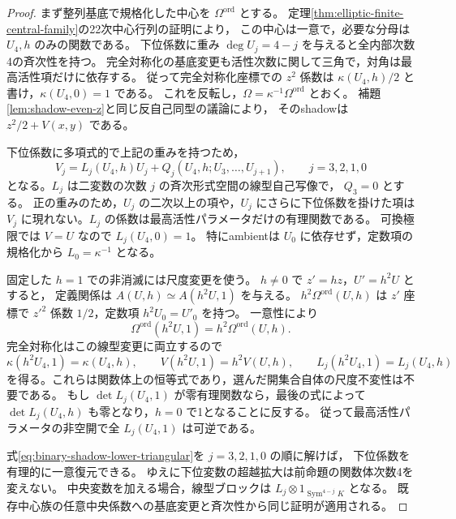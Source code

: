 \begin{proof}
まず整列基底で規格化した中心を $\Omega^{\mathrm{ord}}$ とする。
定理\ref{thm:elliptic-finite-central-family}の22次中心行列の証明により，
この中心は一意で，必要な分母は $U_4,h$ のみの関数である。
下位係数に重み $\deg U_j=4-j$ を与えると全内部次数4の斉次性を持つ。
完全対称化の基底変更も活性次数に関して三角で，対角は最高活性項だけに依存する。
従って完全対称化座標での $z^2$ 係数は
$\kappa(U_4,h)/2$ と書け，$\kappa(U_4,0)=1$ である。
これを反転し，$\Omega=\kappa^{-1}\Omega^{\mathrm{ord}}$ とおく。
補題\ref{lem:shadow-even-z}と同じ反自己同型の議論により，
そのshadowは $z^2/2+V(x,y)$ である。

下位係数に多項式的で上記の重みを持つため，
\begin{equation}\label{eq:binary-shadow-lower-triangular}
 V_j=L_j(U_4,h)U_j+
 Q_j(U_4,h;U_3,\ldots,U_{j+1}),\qquad j=3,2,1,0
\end{equation}
となる。$L_j$ は二変数の次数 $j$ の斉次形式空間の線型自己写像で，
$Q_3=0$ とする。
正の重みのため，$U_j$ の二次以上の項や，$U_j$ にさらに下位係数を掛けた項は
$V_j$ に現れない。$L_j$ の係数は最高活性パラメータだけの有理関数である。
可換極限では $V=U$ なので $L_j(U_4,0)=1$。
特にambientは $U_0$ に依存せず，定数項の規格化から
$L_0=\kappa^{-1}$ となる。

固定した $h=1$ での非消滅には尺度変更を使う。
$h\ne0$ で $z'=hz$，$U'=h^2U$ とすると，
定義関係は $A(U,h)\simeq A(h^2U,1)$ を与える。
$h^2\Omega^{\mathrm{ord}}(U,h)$ は $z'$ 座標で
$z'^2$ 係数 $1/2$，定数項 $h^2U_0=U'_0$ を持つ。
一意性により
\[
 \Omega^{\mathrm{ord}}(h^2U,1)=h^2\Omega^{\mathrm{ord}}(U,h).
\]
完全対称化はこの線型変更に両立するので
\[
 \kappa(h^2U_4,1)=\kappa(U_4,h),\qquad
 V(h^2U,1)=h^2V(U,h),\qquad
 L_j(h^2U_4,1)=L_j(U_4,h)
\]
を得る。これらは関数体上の恒等式であり，選んだ開集合自体の尺度不変性は不要である。
もし $\det L_j(U_4,1)$ が零有理関数なら，最後の式によって
$\det L_j(U_4,h)$ も零となり，$h=0$ で1となることに反する。
従って最高活性パラメータの非空開で全 $L_j(U_4,1)$ は可逆である。

式\eqref{eq:binary-shadow-lower-triangular}を $j=3,2,1,0$ の順に解けば，
下位係数を有理的に一意復元できる。
ゆえに下位変数の超越拡大は前命題の関数体次数4を変えない。
中央変数を加える場合，線型ブロックは
$L_j\otimes1_{\operatorname{Sym}^{4-j}K}$ となる。
既存中心族の任意中央係数への基底変更と斉次性から同じ証明が適用される。
\end{proof}

